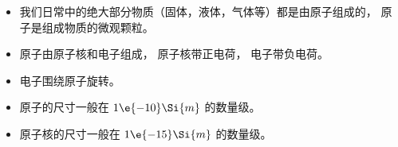 
\begin{issues}
\issueDraft
\end{issues}

\begin{itemize}
\item 我们日常中的绝大部分物质（固体，液体，气体等）都是由原子组成的， 原子是组成物质的微观颗粒。
\item 原子由原子核和电子组成， 原子核带正电荷， 电子带负电荷。
\item 电子围绕原子旋转。
\item 原子的尺寸一般在 $1\e{-10}\Si{m}$ 的数量级。
\item 原子核的尺寸一般在 $1\e{-15}\Si{m}$ 的数量级。
\end{itemize}
